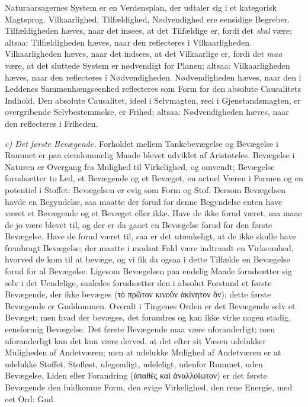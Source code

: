 \documentclass[12pt,a4paper]{book}
\newcommand{\runin}[1]{\emph{#1}\hspace{0.4em}}
\begin{document}
Naturaarsagernes System er en Verdensplan, der udtaler sig i et
kategorisk Magtsprog. Vilkaarlighed, Tilfældighed, Nødvendighed ere
eensidige Begreber. Tilfældigheden hæves, naar det insees, at det
Tilfældige er, fordi det \emph{skal} være; altsaa: Tilfældigheden
hæves, naar den reflecteres i Vilkaarligheden. Vilkaarligheden hæves,
naar det indsees, at det Vilkaarlige er, fordi det \emph{maa} være, at
det sluttede System er nødvendigt for Planen; altsaa: Vilkaarligheden
hæves, naar den reflecteres i Nødvendigheden. Nødvendigheden hæves,
naar den i Leddenes Sammenhængseenhed reflecteres som Form for den
absolute Causalitets Indhold. Den absolute Causalitet, ideel i
Selvmagten, reel i Gjenstandsmagten, er overgribende Selvbestemmelse,
er Frihed; altsaa: Nødvendigheden hæves, naar den reflecteres i
Friheden.

\runin{c) Det første Bevægende.} Forholdet mellem Tankebevægelse og
Bevægelse i Rummet er paa eiendommelig Maade blevet udviklet af
Aristoteles. Bevægelse i Naturen er Overgang fra Mulighed til
Virkelighed, og omvendt; Bevægelse forudsætter to Led, et Bevægende og
et Bevæget, en actuel Væren i Formen og en potentiel i Stoffet:
Bevægelsen er evig som Form og Stof. Dersom Bevægelsen havde en
Begyndelse, saa maatte der forud for denne Begyndelse enten have været
et Bevægende og et Bevæget eller ikke. Have de ikke forud været, saa
maae de jo være blevet til, og der er da gaaet en Bevægelse forud for
den første Bevægelse. Have de forud været til, saa er det utænkeligt,
at de ikke skulle have frembragt Bevægelse; der maatte i modsat Fald
være indtraadt en Virksomhed, hvorved de kom til at bevæge, og vi fik
da ogsaa i dette Tilfælde en Bevægelse forud for al Bevægelse. Ligesom
Bevægelsen paa endelig Maade forudsætter sig selv i det Uendelige,
saaledes forudsætter den i absolut Forstand et første Bevægende, der
ikke bevæges (τὸ πρῶτον κινοῦν ἀκίνητον ὄν); dette første Bevægende er
Guddommen. Overalt i Tingenes Orden er det Bevægende selv et Bevæget;
men hvad der bevæges, det forandres og kan ikke virke nogen stadig,
eensformig Bevægelse. Det første Bevægende maa være uforanderligt; men
uforanderligt kan det kun være derved, at det efter sit Væsen udelukker
Muligheden af Andetværen; men at udelukke Mulighed af Andetværen er at
udelukke Stoffet. Stofløst, ulegemligt, udeleligt, udenfor Rummet, uden
Bevægelse, Liden eller Forandring (ἀπαθὲς καὶ ἀναλλοίωτον) er det
første Bevægende den fuldkomne Form, den evige Virkelighed, den rene
Energie, med eet Ord: Gud.
\end{document}
